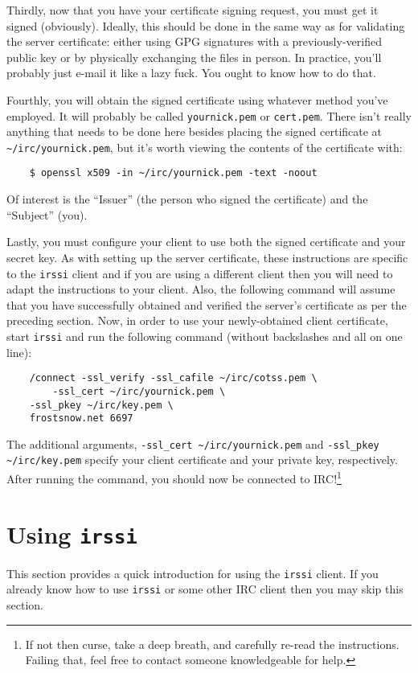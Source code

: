 \documentclass{article}
\begin{document}
{Thirdly, now that you have your certificate signing request, you must get it signed (obviously).  Ideally, this should be done in the same way as for validating the server certificate: either using GPG signatures with a previously-verified public key or by physically exchanging the files in person.  In practice, you'll probably just e-mail it like a lazy fuck.  You ought to know how to do that.

Fourthly, you will obtain the signed certificate using whatever method you've employed.  It will probably be called \texttt{yournick.pem} or \texttt{cert.pem}.  There isn't really anything that needs to be done here besides placing the signed certificate at \texttt{\textasciitilde/irc/yournick.pem}, but it's worth viewing the contents of the certificate with:
\begin{lstlisting}
    $ openssl x509 -in ~/irc/yournick.pem -text -noout
\end{lstlisting}
Of interest is the ``Issuer'' (the person who signed the certificate) and the ``Subject'' (you).

Lastly, you must configure your client to use both the signed certificate and your secret key.  As with setting up the server certificate, these instructions are specific to the \texttt{irssi} client and if you are using a different client then you will need to adapt the instructions to your client.  Also, the following command will assume that you have successfully obtained and verified the server's certificate as per the preceding section.  Now, in order to use your newly-obtained client certificate, start \texttt{irssi} and run the following command (without backslashes and all on one line):
\begin{lstlisting}
    /connect -ssl_verify -ssl_cafile ~/irc/cotss.pem \
        -ssl_cert ~/irc/yournick.pem \
	-ssl_pkey ~/irc/key.pem \
	frostsnow.net 6697
\end{lstlisting}
The additional arguments, \texttt{-ssl\_cert \textasciitilde/irc/yournick.pem} and \texttt{-ssl\_pkey \textasciitilde/irc/key.pem} specify your client certificate and your private key, respectively.  After running the command, you should now be connected to IRC!\footnote{If not then curse, take a deep breath, and carefully re-read the instructions.  Failing that, feel free to contact someone knowledgeable for help.}

\section{Using \texttt{irssi}}
This section provides a quick introduction for using the \texttt{irssi} client.  If you already know how to use \texttt{irssi} or some other IRC client then you may skip this section.

}
\end{document}
